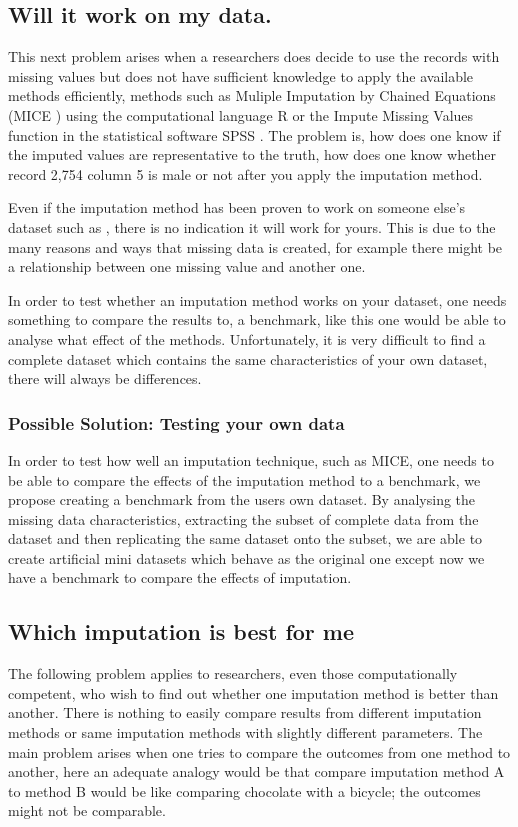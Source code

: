 \documentclass{IEEEconf}
\begin{document}
		\subsection{Will it work on my data.} %
		\label{sub:will_it_work_on_my_data}
			This next problem arises when a researchers does decide to use the records with missing values but does not have sufficient knowledge to apply the available methods efficiently, methods such as Muliple Imputation by Chained Equations (MICE \cite{mice}) using the computational language R \cite{r} or the Impute Missing Values function in the statistical software SPSS \cite{spss}. The problem is, how does one know if the imputed values are representative to the truth, how does one know whether record 2,754 column 5 is male or not after you apply the imputation method.

			Even if the imputation method has been proven to work on someone else's dataset such as \cite{compare}, there is no indication it will work for yours. This is due to the many reasons and ways that missing data is created, for example there might be a relationship between one missing value and another one. 

			In order to test whether an imputation method works on your dataset, one needs something to compare the results to, a benchmark, like this one would be able to analyse what effect of the methods. Unfortunately, it is very difficult to find a complete dataset which contains the same characteristics of your own dataset, there will always be differences. 
			\subsubsection{Possible Solution: Testing your own data} %
			\label{sub:possible_solution}
				In order to test how well an imputation technique, such as MICE, one needs to be able to compare the effects of the imputation method to a benchmark, we propose creating a benchmark from the users own dataset. By analysing the missing data characteristics, extracting the subset of complete data from the dataset and then replicating the same dataset onto the subset, we are able to create artificial mini datasets which behave as the original one except now we have a benchmark to compare the effects of imputation. 
		\subsection{Which imputation is best for me} %
		\label{sub:which_imputation_is_best_for_me}
			The following problem applies to researchers, even those computationally competent, who wish to find out whether one imputation method is better than another. There is nothing to easily compare results from different imputation methods or same imputation methods with slightly different parameters. The main problem arises when one tries to compare the outcomes from one method to another, here an adequate analogy would be that compare imputation method A to method B would be like comparing chocolate with a bicycle; the outcomes might not be comparable. 
\end{document}
